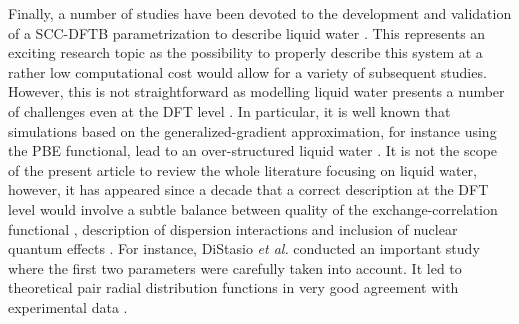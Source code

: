 \documentclass[]{interact}
\theoremstyle{plain}%
\theoremstyle{definition}
\theoremstyle{remark}
\begin{document}
Finally, a number of studies have been devoted to the development and validation of a SCC-DFTB parametrization to
describe liquid water \cite{Maupin2010,Goyal2011,Choi2013,Liang2014,Goyal2014}. This represents an exciting research topic as the
possibility to properly describe this system at a rather low computational cost would allow for a variety of subsequent
studies. However, this is not straightforward as modelling liquid water presents a number of challenges even
at the DFT level \cite{Sprik1996, SilvestrellliLuigiParrinello1999,GrossmanSchweglerDraegerGygiGalli2003,Chen2003,Ramirez2004,
KuoMundyMcGrathSiepmannVandeVondeleSprikHutterKleinMohamedKrackParrinello2004, LeeTuckerman2006b,
Zhang2010,Laage2011,Heyden2012,Kuhne2013,Hassanali2014,Gillan2016,Gasparotto2016,Miceli:2016hy,Chen:2017jn}. In particular, it is well known that simulations based on the generalized-gradient approximation, for instance using the PBE functional, lead to an
over-structured liquid water \cite{Sit2005}. It is not the scope of the present article to review the whole literature focusing on
liquid water, however, it has appeared since a decade that a correct description at the DFT level would involve a
subtle balance between quality of the exchange-correlation functional \cite{VandeVondeleMohamedKrackHutterSprikParrinello2005,Todora2006,GuidonSchiffmanHutterVandeVondele2008,Zhang2011,DiStasio2014,Ambrosio:2016er,Pestana:2017fy}, description of dispersion interactions \cite{LinSeitsonenCoutinhoMauricioTavernelliRothlisberger2009,AndreasKelkkanenAndreWikfeldtJakobJorgenLArsJacobsenNillssonJens2011,Zhang2011A,JohnchiereSeitsonenFerlatSaittaVuilleumier2011} and inclusion of nuclear quantum effects \cite{MorroneCar2008,Ceriotti2013,Fritsch2014,Ceriotti2016}. 
For instance, DiStasio \textit{et al.} conducted an important study where the  first two parameters were carefully taken into account.
It led to theoretical pair radial distribution functions in very good agreement with experimental data \cite{DiStasio2014}.
\end{document}
